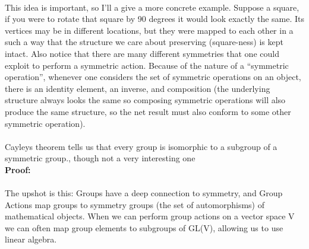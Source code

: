 \documentclass{article}
\begin{document}
\paragraph*{} This idea is important, so I'll a give a more concrete example. 
Suppose a square, if you were to rotate that square by 90 degrees it would look 
exactly the same. Its vertices may be in different locations, but they were mapped 
to each other in a such a way that the structure we care about preserving 
(square-ness) is kept intact. Also notice that there are many different symmetries 
that one could exploit to perform a symmetric action. Because of the nature of 
a “symmetric operation”, whenever one considers the set of symmetric operations 
on an object, there is an identity element, an inverse, and composition 
(the underlying structure always looks the same so composing symmetric operations 
will also produce the same structure, so the net result must also conform to some 
other symmetric operation). 
\paragraph*{} Cayleys theorem tells us that every group is isomorphic to a 
subgroup of a symmetric group., though not a very interesting one \\
\textbf{Proof:}
\paragraph*{} The upshot is this: Groups have a deep connection to symmetry, 
and Group Actions map groups to symmetry groups (the set of automorphisms) of 
mathematical objects. When we can perform group actions on a vector space V we 
can often map group elements to subgroups of GL(V), allowing us to use linear 
algebra.
\end{document}

